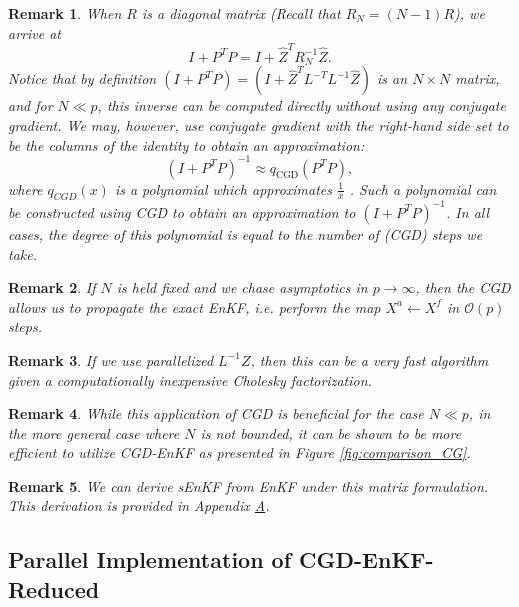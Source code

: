 \documentclass[11p]{elsarticle}
\numberwithin{equation}{section}
\newtheorem{remark}{Remark}
\begin{document}
\begin{remark}
    When $R$ is a diagonal matrix (Recall that $R_N=(N-1)R$), we arrive at
\begin{equation}
    I+P^TP = I+\widehat{Z}^TR_N^{-1}\widehat{Z}.
\end{equation}
Notice that by definition 
\( (I+P^TP) = \left(I+\widehat{Z}^TL^{-T}L^{-1}\widehat{Z}\right)\) 
is an $N\times N$ matrix, and for $N\ll p$, this inverse can be computed directly without using any conjugate gradient.  We may, however, use conjugate gradient with the right-hand side set to be the columns of the identity to obtain an approximation: 
\[
(I+P^TP)^{-1}\approx q_{\text{CGD}}(P^TP),
\]
where $q_{CGD}(x)$ is a polynomial which approximates 
$\frac1x$ \cite{Kraus2012}. Such a polynomial can be constructed using CGD to obtain an approximation to \((I+P^TP)^{-1}\). 
In all cases, the degree of this polynomial is equal to the number of (CGD) steps we take. 
\end{remark}


\begin{remark}
    If $N$ is held fixed and we chase asymptotics in $p\to\infty$, then the CGD allows us to propagate the exact EnKF, i.e. perform the map $X^a\leftarrow X^f$ 
in $\mathcal{O}(p)$ steps.
\end{remark}

\begin{remark}
    If we use parallelized $L^{-1} Z$, then this can be a very fast algorithm given a computationally inexpensive Cholesky factorization.
\end{remark}

\begin{remark}
    While this application of CGD is beneficial for the case $N \ll p$, in the more general case where $N$ is not bounded, it can be shown to be more efficient to utilize CGD-EnKF as presented in Figure \ref{fig:comparison_CG}.
\end{remark}

\begin{remark}
    We can derive sEnKF from EnKF under this matrix formulation.  This derivation is provided in Appendix \href{sec:app}{A}.
\end{remark}


\subsection{Parallel Implementation of CGD-EnKF-Reduced} 
\label{sec:parallel_reduced} 
\end{document}

